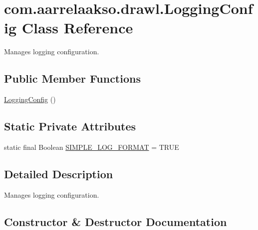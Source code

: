 \hypertarget{classcom_1_1aarrelaakso_1_1drawl_1_1_logging_config}{}\section{com.\+aarrelaakso.\+drawl.\+Logging\+Config Class Reference}
\label{classcom_1_1aarrelaakso_1_1drawl_1_1_logging_config}


Manages logging configuration.  


\subsection*{Public Member Functions}
\begin{DoxyCompactItemize}
\item 
\hyperlink{classcom_1_1aarrelaakso_1_1drawl_1_1_logging_config_a5f20bbe782ebdc46865c3d38828672f1}{Logging\+Config} ()
\end{DoxyCompactItemize}
\subsection*{Static Private Attributes}
\begin{DoxyCompactItemize}
\item 
static final Boolean \hyperlink{classcom_1_1aarrelaakso_1_1drawl_1_1_logging_config_a1cfdfab19a9fd0f78da68dc8bcce3144}{S\+I\+M\+P\+L\+E\+\_\+\+L\+O\+G\+\_\+\+F\+O\+R\+M\+AT} = T\+R\+UE
\end{DoxyCompactItemize}


\subsection{Detailed Description}
Manages logging configuration. 

\subsection{Constructor \& Destructor Documentation}
\mbox{\label{classcom_1_1aarrelaakso_1_1drawl_1_1_logging_config_a5f20bbe782ebdc46865c3d38828672f1}} 
